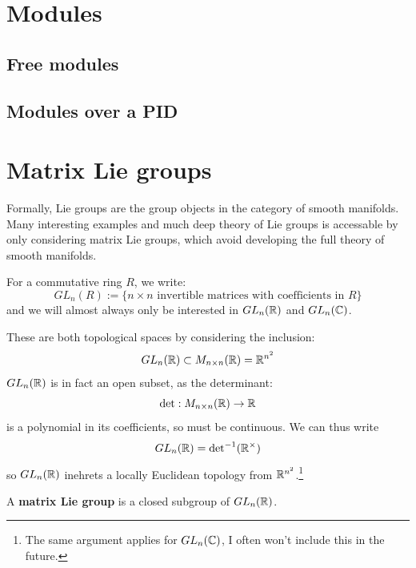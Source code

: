 \documentclass{article}
\begin{document}
\section{Modules}

\subsection{Free modules}

\subsection{Modules over a PID}

\newpage

\section{Matrix Lie groups}

Formally, Lie groups are the group objects in the category of smooth manifolds. Many interesting examples and much deep theory of Lie groups is accessable by only considering matrix Lie groups, which avoid developing the full theory of smooth manifolds.

\begin{definition}
    For a commutative ring $R$, we write: \[
    GL_n(R) := \{n\times n\text{ invertible matrices with coefficients in $R$}\}
    \] and we will almost always only be interested in $GL_n(\mathbb{R})$ and $GL_n(\mathbb{C})$.
\end{definition}

These are both topological spaces by considering the inclusion: \[
    GL_n(\mathbb{R})\subset M_{n\times n}(\mathbb{R}) = \mathbb{R}^{n^2}
\] $GL_n(\mathbb{R})$ is in fact an open subset, as the determinant: \[
    \det: M_{n\times n}(\mathbb{R})\rightarrow \mathbb{R}
\] is a polynomial in its coefficients, so must be continuous. We can thus write \[
GL_n(\mathbb{R}) = {\det}^{-1}(\mathbb{R}^\times)
\] so $GL_n(\mathbb{R})$ inehrets a locally Euclidean topology from $\mathbb{R}^{n^2}$.\footnote{The same argument applies for $GL_n(\mathbb{C})$, I often won't include this in the future.}

\begin{definition}
    A \textbf{matrix Lie group} is a closed subgroup of $GL_n(\mathbb{R})$.
\end{definition}
\end{document}
